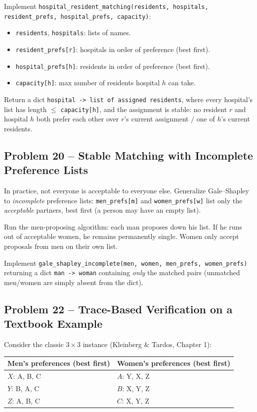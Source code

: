 \documentclass[11pt]{article}
\begin{document}
Implement \texttt{hospital\_resident\_matching(residents, hospitals, resident\_prefs,
hospital\_prefs, capacity)}:
\begin{itemize}
    \item \texttt{residents}, \texttt{hospitals}: lists of names.
    \item \texttt{resident\_prefs[r]}: hospitals in order of preference (best first).
    \item \texttt{hospital\_prefs[h]}: residents in order of preference (best first).
    \item \texttt{capacity[h]}: max number of residents hospital $h$ can take.
\end{itemize}
Return a dict \texttt{hospital -> list of assigned residents}, where every hospital's list
has length $\le$ \texttt{capacity[h]}, and the assignment is stable: no resident $r$ and
hospital $h$ both prefer each other over $r$'s current assignment / one of $h$'s current
residents.

\subsection*{Problem 20 -- Stable Matching with Incomplete Preference Lists}

In practice, not everyone is acceptable to everyone else. Generalize Gale--Shapley to
\emph{incomplete} preference lists: \texttt{men\_prefs[m]} and \texttt{women\_prefs[w]}
list only the \emph{acceptable} partners, best first (a person may have an empty list).

Run the men-proposing algorithm: each man proposes down his list. If he runs out of
acceptable women, he remains permanently single. Women only accept proposals from men on
their own list.

Implement \texttt{gale\_shapley\_incomplete(men, women, men\_prefs, women\_prefs)}
returning a dict \texttt{man -> woman} containing \emph{only} the matched pairs
(unmatched men/women are simply absent from the dict).

\subsection*{Problem 22 -- Trace-Based Verification on a Textbook Example}

Consider the classic $3\times3$ instance (Kleinberg \& Tardos, Chapter 1):

\begin{center}
\begin{tabular}{@{}ll@{}}
\toprule
Men's preferences (best first) & Women's preferences (best first) \\
\midrule
$X$: A, B, C & $A$: Y, X, Z \\
$Y$: B, A, C & $B$: X, Y, Z \\
$Z$: A, B, C & $C$: X, Y, Z \\
\bottomrule
\end{tabular}
\end{center}
\end{document}
